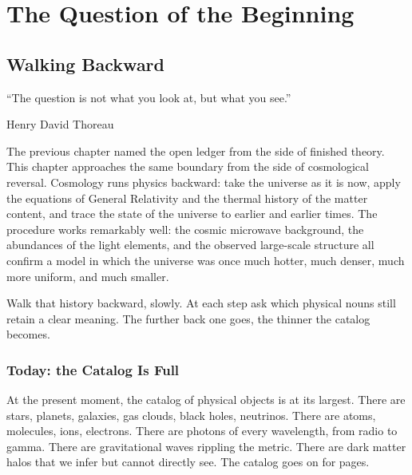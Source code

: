 \documentclass[11pt,a4paper]{book}
\begin{document}

\part*{The Question of the Beginning}

\chapter{Walking Backward}
\label{ch:walking-backward}

\epigraph{``The question is not what you look at, but what you see.''}{Henry David Thoreau}

The previous chapter named the open ledger from the side of finished theory. This chapter approaches the same boundary from the side of cosmological reversal. Cosmology runs physics backward: take the universe as it is now, apply the equations of General Relativity and the thermal history of the matter content, and trace the state of the universe to earlier and earlier times. The procedure works remarkably well: the cosmic microwave background, the abundances of the light elements, and the observed large-scale structure all confirm a model in which the universe was once much hotter, much denser, much more uniform, and much smaller.

Walk that history backward, slowly. At each step ask which physical nouns still retain a clear meaning. The further back one goes, the thinner the catalog becomes.

\section*{Today: the Catalog Is Full}

At the present moment, the catalog of physical objects is at its largest. There are stars, planets, galaxies, gas clouds, black holes, neutrinos. There are atoms, molecules, ions, electrons. There are photons of every wavelength, from radio to gamma. There are gravitational waves rippling the metric. There are dark matter halos that we infer but cannot directly see. The catalog goes on for pages.
\end{document}
